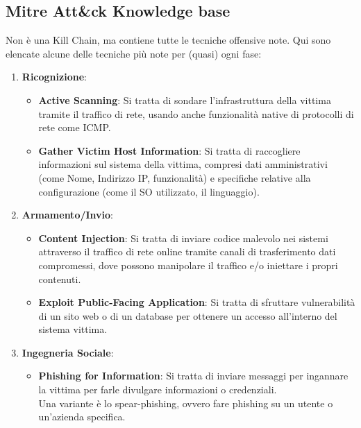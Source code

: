 \documentclass{article}
\begin{document}
\subsection{Mitre Att\&ck Knowledge base}
Non è una Kill Chain, ma contiene tutte le tecniche offensive note. Qui sono elencate alcune delle tecniche più note per (quasi) ogni fase:
\begin{enumerate}
    \item \textbf{Ricognizione}:
        \begin{itemize}
            \item \textbf{Active Scanning}: Si tratta di sondare l'infrastruttura della vittima tramite il traffico di rete, usando anche funzionalità native di protocolli di rete come ICMP.
            
            \item \textbf{Gather Victim Host Information}: Si tratta di raccogliere informazioni sul sistema della vittima, compresi dati amministrativi (come Nome, Indirizzo IP, funzionalità) e specifiche relative alla configurazione (come il SO utilizzato, il linguaggio). 
        \end{itemize}

    \item \textbf{Armamento/Invio}:
        \begin{itemize}
            \item \textbf{Content Injection}: Si tratta di inviare codice malevolo nei sistemi attraverso il traffico di rete online tramite canali di trasferimento dati compromessi, dove possono manipolare il traffico e/o iniettare i propri contenuti.

            \item \textbf{Exploit Public-Facing Application}: Si tratta di sfruttare vulnerabilità di un sito web o di un database per ottenere un accesso all'interno del sistema vittima.
        \end{itemize}

    \item \textbf{Ingegneria Sociale}:
        \begin{itemize}
            \item \textbf{Phishing for Information}: Si tratta di inviare messaggi per ingannare la vittima per farle divulgare informazioni o credenziali.\\
            Una variante è lo spear-phishing, ovvero fare phishing su un utente o un'azienda specifica.
        \end{itemize}


\end{enumerate}
\end{document}
